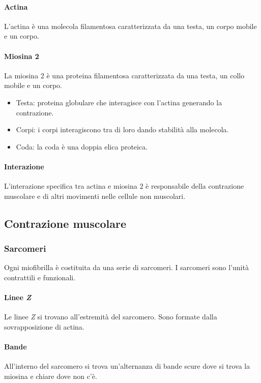			\paragraph{Actina}
			L'actina \`e una molecola filamentosa caratterizzata da una testa, un corpo mobile e un corpo.

			\paragraph{Miosina 2}
			La miosina 2 \`e una proteina filamentosa caratterizzata da una testa, un collo mobile e un corpo.
			\begin{multicols}{2}
				\begin{itemize}
					\item Testa: proteina globulare che interagisce con l'actina generando la contrazione.
					\item Corpi: i corpi interagiscono tra di loro dando stabilit\`a alla molecola.
					\item Coda: la coda \`e una doppia elica proteica.
				\end{itemize}
			\end{multicols}

			\paragraph{Interazione}
			L'interazione specifica tra actina e miosina $2$ \`e responsabile della contrazione muscolare e di altri movimenti nelle cellule non muscolari.
	
	\subsection{Contrazione muscolare}

		\subsubsection{Sarcomeri}
		Ogni miofibrilla \`e costituita da una serie di sarcomeri.
		I sarcomeri sono l'unit\`a contrattili e funzionali.

			\paragraph{Linee \emph{Z}}
			Le linee \emph{Z} si trovano all'estremit\`a del sarcomero.
			Sono formate dalla sovrapposizione di actina.

			\paragraph{Bande}
			All'interno del sarcomero si trova un'alternanza di bande scure dove si trova la miosina e chiare dove non c'\`e.

